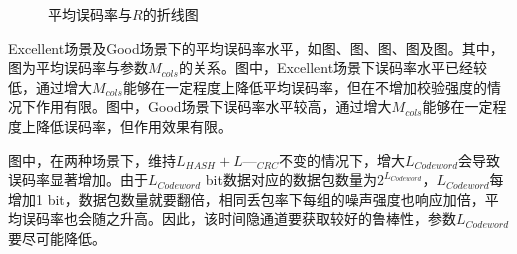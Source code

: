 {    \begin{figure}
        \centering
        \caption{平均误码率与$R$的折线图}
        \label{fig:5:result:ber:r}
    \end{figure}
}

Excellent场景及Good场景下的平均误码率水平，如图、图、图、图及图。其中，图为平均误码率与参数$M_{cols}$的关系。图中，Excellent场景下误码率水平已经较低，通过增大$M_{cols}$能够在一定程度上降低平均误码率，但在不增加校验强度的情况下作用有限。图中，Good场景下误码率水平较高，通过增大$M_{cols}$能够在一定程度上降低误码率，但作用效果有限。

图中，在两种场景下，维持$L_{HASH}+L—_{CRC}$不变的情况下，增大$L_{Codeword}$会导致误码率显著增加。由于$L_{Codeword}$ bit数据对应的数据包数量为$2^{L_{Codeword}}$，$L_{Codeword}$每增加1 bit，数据包数量就要翻倍，相同丢包率下每组的噪声强度也响应加倍，平均误码率也会随之升高。因此，该时间隐通道要获取较好的鲁棒性，参数$L_{Codeword}$要尽可能降低。

